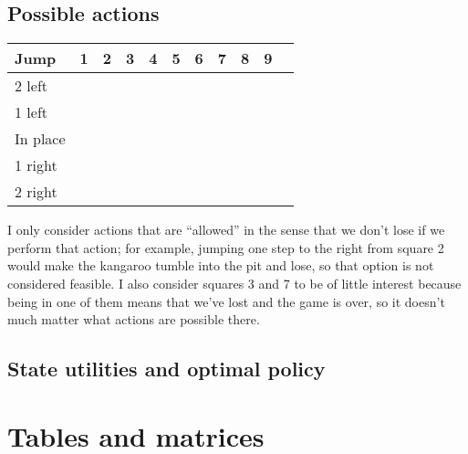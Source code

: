 \documentclass[letterpaper, 10pt]{article}
\begin{document}
\begin{multicols}{2}
\subsection{Possible actions}
	\begin{tabular}{lcccccccccc}
		Jump & 1 & 2 & 3 & 4 & 5 & 6 & 7 & 8 & 9 \\
		\midrule
		2 left   & \checkmark & \checkmark & & \checkmark & & \checkmark & & \checkmark &  \\
		1 left   & \checkmark & \checkmark & & & \checkmark & \checkmark & & & \checkmark \\
		In place & \checkmark & \checkmark & & \checkmark & \checkmark & \checkmark & & \checkmark & \checkmark \\
		1 right  & \checkmark & & & \checkmark & \checkmark & & & \checkmark & \checkmark \\
		2 right  & & \checkmark & & \checkmark & & \checkmark & & \checkmark & \checkmark \\
	\end{tabular}

\vspace{10pt}

\noindent 
I only consider actions that are ``allowed'' in the sense that we don't lose if we perform that action; for example, jumping one step to the right from square 2 would make the kangaroo tumble into the pit and lose, so that option is not considered feasible. I also consider squares 3 and 7 to be of little interest because being in one of them means that we've lost and the game is over, so it doesn't much matter what actions are possible there.


\subsection{State utilities and optimal policy}

\end{multicols}

\clearpage
\appendix
\section{Tables and matrices}
\end{document}
